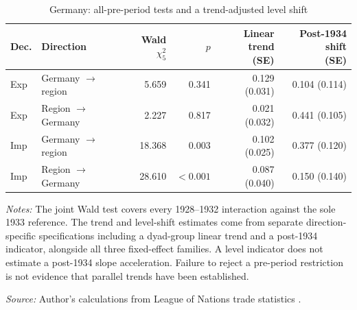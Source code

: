 \begin{table}[!htbp]\centering
\caption{Germany: all-pre-period tests and a trend-adjusted level shift}\label{tab:app_germany_diagnostics}
\begin{threeparttable}\footnotesize\setlength{\tabcolsep}{4pt}
\begin{tabular}{@{}llrrrr@{}}
\toprule
Dec. & Direction & Wald $\chi^2_5$ & $p$ & \shortstack{Linear trend\\(SE)} & \shortstack{Post-1934 shift\\(SE)} \\
\midrule
Exp & Germany $\to$ region & 5.659 & 0.341 & 0.129 (0.031) & 0.104 (0.114) \\
Exp & Region $\to$ Germany & 2.227 & 0.817 & 0.021 (0.032) & 0.441 (0.105) \\
Imp & Germany $\to$ region & 18.368 & 0.003 & 0.102 (0.025) & 0.377 (0.120) \\
Imp & Region $\to$ Germany & 28.610 & $<0.001$ & 0.087 (0.040) & 0.150 (0.140) \\
\bottomrule
\end{tabular}
\begin{tablenotes}[flushleft]\footnotesize\item \textit{Notes:} The joint Wald test covers every 1928--1932 interaction against the sole 1933 reference. The trend and level-shift estimates come from separate direction-specific specifications including a dyad-group linear trend and a post-1934 indicator, alongside all three fixed-effect families. A level indicator does not estimate a post-1934 slope acceleration. Failure to reject a pre-period restriction is not evidence that parallel trends have been established.
\item \textit{Source:} Author's calculations from League of Nations trade statistics \parencite{league1930,league1936,league1938}.
\end{tablenotes}\end{threeparttable}\end{table}
